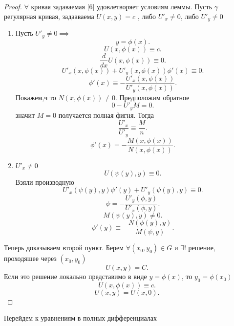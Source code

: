 \documentclass[14pt]{extarticle}
\begin{document}
\begin{proof}
	$\forall $ кривая задаваемая \ref{6} удовлетворяет условиям леммы. Пусть $\gamma$
	регулярная кривая, задааваема  $U(x,y) =  c$ , либо  $U'_{x} \neq 0$, либо $U'_{y} \neq 0$
	\begin{enumerate}
		\item Пусть $U'_{y} \neq 0 \implies$
		      \[
			      y = \phi(x)
			      .\]
		      \[
			      U(x,\phi(x)) \equiv c
			      .\]
		      \[
			      \frac{d}{dx} U(x,\phi(x)) \equiv 0
			      .\]
		      \[
			      U'_{x}(x,\phi(x)) + U'_{y}(x,\phi(x)) \phi'(x) \equiv 0
			      .\]
		      \[
			      \phi'(x) \equiv - \frac{U'_{x} (x,\phi(x))}{U'_{y} (x,\phi(x))}
			      .\]
		      Покажем,ч то $N(x,\phi(x)) \neq 0$. Предположим обратное
		      \[
			      0 - U'_{y} M = 0
			      .\]
		      значит $M = 0$ получается полная фигня. Тогда
		      \[
			      \frac{U'_{x}}{U'_{y}} \equiv \frac{M}{n}
			      .\]
		      \[
			      \phi'(x) = - \frac{M(x,\phi(x))}{N(x,\phi(x))}
			      .\]
		\item  $U'_{x} \neq 0$
		      \[
			      U(\psi(y),y) \equiv 0
			      .\]
		      Взяли производную
		      \[
			      U'_{x}(\psi(y),y)\psi'(y) + U'_{y}(\psi(y),y) \equiv 0
			      .\]
		      \[
			      \psi =  - \frac{U'_{y}(\phi,y)}{U'_{x}(\phi,y)}
			      .\]
		      \[
			      M(\psi(y),y) \neq 0
			      .\]
		      \[
			      \psi'(y) \equiv - \frac{N(\phi(y),y)}{M(\psi,y)}
			      .\]
	\end{enumerate}
	Теперь доказываем второй пункт. Берем $\forall (x_0,y_0) \in G$ и $\exists !$ решение, проходяшее через $(x_0,y_0)$
	\[
		U(x,y) = C
		.\]
	Если это решение локально представимо в виде $y = \phi(x)$, то $y_0 = \phi(x_0)$
	\[
		U(x,\phi(x)) \equiv c
		.\]
	\[
		U(x,y) = U(x,0)
		.\]
\end{proof}
Перейдем к уравнениям в полных дифференциалах
\end{document}
